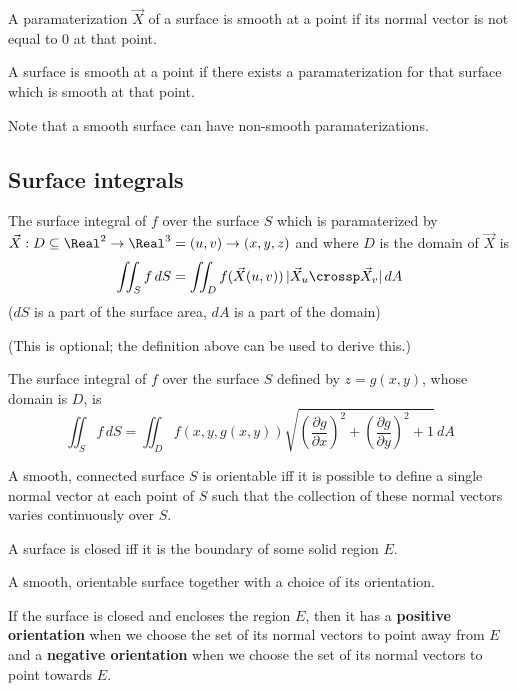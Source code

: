 \begin{definition}[Smooth]
  A paramaterization $\vec{X}$ of a surface is smooth at a point if its normal vector is not equal to 0 at that point.

  A surface is smooth at a point if there exists a paramaterization for that surface which is smooth at that point.

  Note that a smooth surface can have non-smooth paramaterizations.
\end{definition}

\subsection{Surface integrals}

\begin{definition}
  The surface integral of $f$ over the surface $S$ which is paramaterized by $\vec{X} : D \subseteq \Real^2 \to \Real^3 = (u, v) \to (x, y, z)$ and where $D$ is the domain of $\vec{X}$ is
  \[
    \iint_S f \,dS = \iint_D f(\vec{X}(u, v)) \, |\vec{X}_u \crossp \vec{X}_v| \,dA
  \]
  ($dS$ is a part of the surface area, $dA$ is a part of the domain)
\end{definition}

\begin{definition}
  (This is optional; the definition above can be used to derive this.)

  The surface integral of $f$ over the surface $S$ defined by $z = g(x, y)$, whose domain is $D$, is
  \[
    \iint_S f \,dS = \iint_D f(x, y, g(x, y)) \sqrt{\left(\frac{\partial g}{\partial x}\right)^2 + \left(\frac{\partial g}{\partial y}\right)^2 + 1} \,dA
  \]
\end{definition}

\begin{definition}
  A smooth, connected surface $S$ is orientable iff it is possible to define a single normal vector at each point of $S$ such that the collection of these normal vectors varies continuously over $S$.
\end{definition}

\begin{definition}
  A surface is closed iff it is the boundary of some solid region $E$.
\end{definition}

\begin{definition}
  A smooth, orientable surface together with a choice of its orientation.

  If the surface is closed and encloses the region $E$, then it has a \textbf{positive orientation} when we choose the set of its normal vectors to point away from $E$ and a \textbf{negative orientation} when we choose the set of its normal vectors to point towards $E$.
\end{definition}

